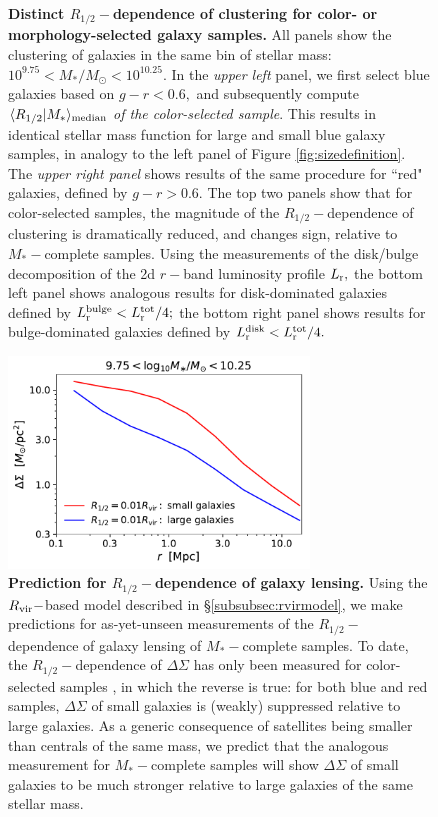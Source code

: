 \documentclass[usenatbib,usegraphicx,letterpaper]{mn2e}
\newcommand{\rhalf}{R_{1/2}}
\newcommand{\mstar}{M_{\ast}}
\newcommand{\rvir}{R_{\rm vir}}
\newcommand{\median}[2]{\langle{#1}\vert{#2}\rangle_{\rm median}}
\newcommand{\msun}{M_\odot}
\begin{document}
\begin{figure}
\caption{
{\bf Distinct $\rhalf-$dependence of clustering for color- or morphology-selected galaxy samples.}
All panels show the clustering of galaxies in the same bin of stellar mass: $10^{9.75}<\mstar/\msun<10^{10.25}.$ In the {\em upper left} panel, we first select blue galaxies based on $g-r<0.6,$ and subsequently compute $\median{\rhalf}{\mstar}$ {\em of the color-selected sample}. This results in identical stellar mass function for large and small blue galaxy samples, in analogy to the left panel of Figure \ref{fig:sizedefinition}. The {\em upper right panel} shows results of the same procedure for ``red" galaxies, defined by $g-r>0.6.$ The top two panels show that for color-selected samples, the magnitude of the $\rhalf-$dependence of clustering is dramatically reduced, and changes sign, relative to $\mstar-$complete samples. Using the \citet{meert_etal15} measurements of the disk/bulge decomposition of the 2d $r-$band luminosity profile $L_{\rm r},$ the bottom left panel shows analogous results for disk-dominated galaxies defined by $L_{\rm r}^{\rm bulge}<L_{\rm r}^{\rm tot}/4;$ the bottom right panel shows results for bulge-dominated galaxies defined by $L_{\rm r}^{\rm disk}<L_{\rm r}^{\rm tot}/4.$
}
\label{fig:colorclustering}
\end{figure}

\begin{figure}
\centering
\includegraphics[width=8cm]{FIGS/rvir_only_lensing_prediction.pdf}
\caption{
{\bf Prediction for $\rhalf-$dependence of galaxy lensing.}
Using the $\rvir-$based model described in \S\ref{subsubsec:rvirmodel}, we make predictions for as-yet-unseen measurements of the $\rhalf-$dependence of galaxy lensing of $\mstar-$complete samples. To date, the $\rhalf-$dependence of $\Delta\Sigma$ has only been measured for color-selected samples \citep{charlton_etal17}, in which the reverse is true: for both blue and red samples, $\Delta\Sigma$ of small galaxies is (weakly) suppressed relative to large galaxies. As a generic consequence of satellites being smaller than centrals of the same mass, we predict that the analogous measurement for $\mstar-$complete samples will show $\Delta\Sigma$ of small galaxies to be much stronger relative to large galaxies of the same stellar mass.
}
\label{fig:lensingprediction}
\end{figure}
\end{document}
